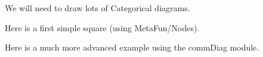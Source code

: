 

We will need to draw lots of Categorical diagrams.

Here is a first simple square (using MetaFun/Nodes).



Here is a much more advanced example using the commDiag module.


\begin{center}
\end{center}